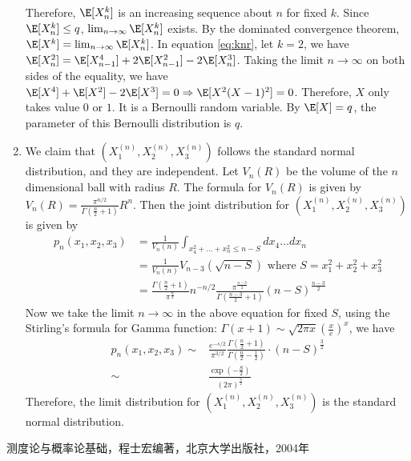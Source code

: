 \documentclass{article}
\begin{document}
\begin{enumerate}
Therefore,
$\E[X_{n}^k]$ is an increasing sequence about $n$ for fixed $k$. Since $\E[X_{n}^k] \leq q$,
$\lim_{n\to \infty} \E[X_n^k]$ exists.
By the dominated convergence theorem,
$\E[X^k] = \lim_{n\to\infty} \E[X_{n}^k]$.
In equation \eqref{eq:knr}, let $k=2$,
we have
$\E[X_{n}^2] = \E[X_{n-1}^4]
+2\E[X_{n-1}^2] - 2\E[X_n^3]$.
Taking the limit $n\to \infty$ on both
sides of the equality, we have
$\E[X^4]+\E[X^2]-2\E[X^3]=0 \Rightarrow
\E[X^2(X-1)^2]=0$. Therefore, $X$ only
takes value $0$ or $1$. It is a Bernoulli
random variable. By $\E[X]=q$, the parameter
of this Bernoulli distribution is $q$.
\item We claim that $(X_1^{(n)},
X_2^{(n)}, X_3^{(n)})
$ follows the standard normal distribution, and
they are independent.
Let $V_n(R)$ be the volume of the $n$
dimensional ball with radius $R$.
The formula for $V_n(R)$
is given by $V_n(R)=\frac{\pi^{n/2}}{\Gamma(\frac{n}{2}+1)}R^n$. Then the joint distribution
for $(X_1^{(n)},
X_2^{(n)}, X_3^{(n)})
$ is given by
\begin{align*}
    p_n(x_1, x_2, x_3)
    &= \frac{1}{V_n(n)}
    \int_{x_4^2+\dots + x_n^2 \leq n - S} dx_4\dots dx_n \\
    &= \frac{1}{V_n(n)} V_{n-3}(\sqrt{n-S})
    \textrm{ where } S=x_1^2 + x_2^2 + x_3^2 \\
    & = \frac{\Gamma(\frac{n}{2} + 1)}{\pi^{\frac{n}{2}}} n^{-n/2}
    \frac{\pi^{\frac{n-3}{2}}}{\Gamma(\frac{n-3}{2} + 1)} (n-S)^{\frac{n-3}{2}}
\end{align*}
Now we take the limit $n\to \infty$ in the above
equation for fixed $S$, using the Stirling's
formula for Gamma function:
$\Gamma(x+1) \sim \sqrt{2\pi x}(\frac{x}{e})^x$,
we have
\begin{align*}
    p_n(x_1, x_2, x_3) \sim
    & \frac{e^{-s/2}}{\pi^{3/2}}
    \frac{\Gamma(\frac{n}{2}+1)}{\Gamma(\frac{n}{2}-\frac{1}{2})}\cdot (n-S)^{\frac{3}{2}}
    \\
    \sim &
    \frac{\exp(-\frac{S}{2})}{(2\pi)^{\frac{3}{2}}}
\end{align*}
Therefore, the limit distribution for $(X_1^{(n)},
X_2^{(n)}, X_3^{(n)})
$ is the standard normal distribution.
\end{enumerate}
\begin{thebibliography}{9}
 测度论与概率论基础，程士宏编著，北京大学出版社，2004年

\end{thebibliography}
\end{document}
